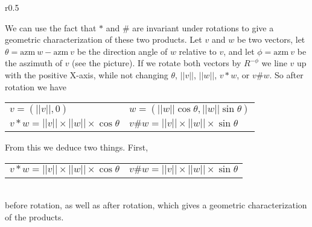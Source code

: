 \documentclass[12pt]{article}
\begin{document}
\begin{minipage}{\textwidth}\raggedright
\begin{wrapfigure}{r}{0.5\textwidth}
\end{wrapfigure}
We can use the fact that $*$ and $\#$ are invariant under
rotations to give a geometric characterization
of these two products.  Let $v$ and $w$ be two vectors, let
$\theta=\mathrm{azm}~w - \mathrm{azm}~v$ be the direction angle of $w$
relative to $v$, and let $\phi = \mathrm{azm}~v$ be the aszimuth of $v$
(see the picture).
If we rotate both vectors by $R^{-\phi}$
we line $v$ up with the positive X-axis, while not changing $\theta$,
$||v||$, $||w||$, $v*w$, or $v\#w$.  So after rotation we have
\hspace*{0.5in}
    \begin{tabular}{l@{~~~~~}l}
    $v=(||v||,0)$ &
    $w=(||w||\cos\theta,||w||\sin\theta)$ \\
    $v*w=||v||\times||w||\times\cos\theta$ & 
    $v\#w=||v||\times||w||\times\sin\theta$ \\
    \end{tabular}
\end{minipage}

From this we deduce two things.  First, \\
\hspace*{0.5in}
    \begin{tabular}{l@{~~~~~}l}
    $v*w=||v||\times||w||\times\cos\theta$ &
    $v\#w=||v||\times||w||\times\sin\theta$ \\
    \end{tabular} \\
before rotation, as well as after rotation,
which gives a geometric characterization of the products.
\end{document}
